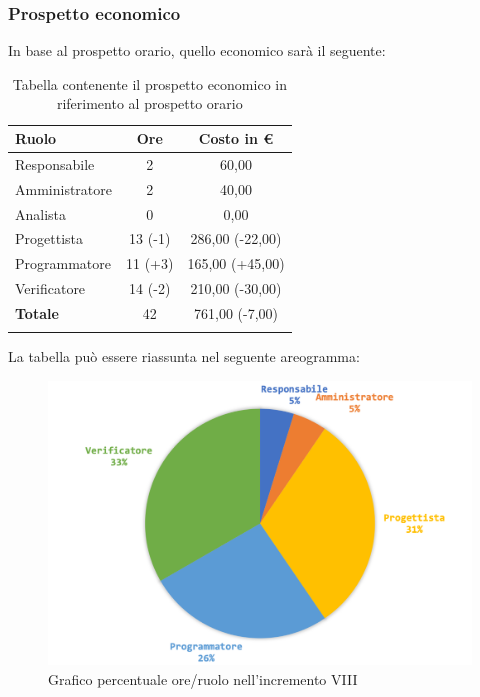 		\subsubsection{Prospetto economico}
			In base al prospetto orario, quello economico sarà il seguente: 
		
		\begin{longtable}{|l|c|c|}
			\hline
			\rowcolor{lighter-grayer}
			\textbf{Ruolo} & \textbf{Ore} & \textbf{Costo in € } \\
			\hline
			\endfirsthead
			
			\hline
			Responsabile 	    & 2 & 60,00\\
			\hline 
			\hline
			Amministratore	   & 2 & 40,00\\
			\hline
			\hline
			Analista 				& 0 & 0,00\\
			\hline
			\hline
			Progettista 		   & 13 (-1) & 286,00 (-22,00)\\
			\hline
			\hline
			Programmatore 	  & 11 (+3) & 165,00 (+45,00)\\
			\hline
			\hline
			Verificatore 		   & 14 (-2) & 210,00 (-30,00)\\
			\hline
			\textbf{Totale} 	 & 42 & 761,00 (-7,00)\\
			\hline
			\caption{Tabella contenente il prospetto economico in riferimento al prospetto orario}
		\end{longtable}
		\pagebreak
		
		La tabella può essere riassunta nel seguente areogramma:
		\begin{figure}[H]
			\centering
			\includegraphics[width=0.8\linewidth]{images/consuntivo/ConsIncr8-2.png}
			\caption{Grafico percentuale ore/ruolo nell'incremento VIII}
			\label{fig:consuntivo grafico costi ruolo incremento VIII}
		\end{figure}
		
